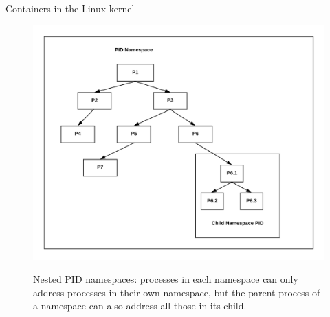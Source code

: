 \begin{frame}{Containers in the Linux kernel}
	\begin{figure}
		\centering
		\includegraphics[scale=.125]{pidNamespace.png}
		\label{fig:pidnamespace}
		\caption{Nested PID namespaces: processes in each namespace can only address processes in their own namespace, but the parent process of a namespace can also address all those in its child.}
	\end{figure}
\end{frame}
